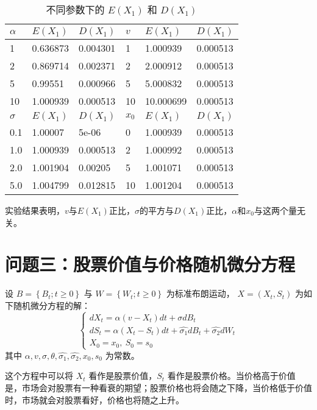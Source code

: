 \documentclass{article}
\begin{document}
\begin{table}[H]
    \centering
    \caption{不同参数下的 $E(X_1)$ 和 $D(X_1)$}
    \begin{tabular}{l|l|l|l|l|l}
    \hline
    $\alpha$ & $E(X_1)$ & $D(X_1)$ & $v$    & $E(X_1)$ & $D(X_1)$ \\ \hline
    1     & 0.636873 & 0.004301 & 1    & 1.000939  & 0.000513 \\
    2     & 0.869714 & 0.002371 & 2    & 2.000912  & 0.000513 \\
    5     & 0.99551  & 0.000966 & 5    & 5.000832  & 0.000513 \\
    10    & 1.000939 & 0.000513 & 10   & 10.000699 & 0.000513 \\ \hline 
    $\sigma$ & $E(X_1)$ & $D(X_1)$ & $x_0$ & $E(X_1)$ & $D(X_1)$ \\ \hline
    0.1   & 1.00007  & 5e-06    & 0    & 1.000939  & 0.000513 \\
    1.0   & 1.000939 & 0.000513 & 2    & 1.000992  & 0.000513 \\
    2.0   & 1.001904 & 0.00205  & 5    & 1.001071  & 0.000513 \\
    5.0   & 1.004799 & 0.012815 & 10   & 1.001204  & 0.000513 \\ \hline
    \end{tabular}
\end{table}
    
实验结果表明，$v$与$E(X_1)$正比，$\sigma$的平方与$D(X_1)$正比，$\alpha$和$x_0$与这两个量无关。




\section{问题三：股票价值与价格随机微分方程}
设 $B=\left\{B_{t} ; t \geq 0\right\}$ 与 $W=\left\{W_{t} ; t \geq 0\right\}$ 为标准布朗运动， $X=\left(X_{t} , S_t\right)$ 为如下随机微分方程的解：
$$
\left\{\begin{array}{l}
d X_{t}=\alpha\left(v-X_{t}\right) d t+\sigma d B_{t} \\
d S_{t} = \alpha\left(X_{t}-S_{t}\right) d t+\hat{\sigma_1} dB_t + \hat{\sigma_2} dW_t\\
X_{0}=x_{0}, \ S_0 = s_0
\end{array}\right.
$$
其中 $\alpha, v, \sigma, \theta, \hat{\sigma_1}, \hat{\sigma_2}, x_{0}, s_0$ 为常数。

这个方程中可以将 $X_t$ 看作是股票价值，$S_t$ 看作是股票价格。当价格高于价值是，市场会对股票有一种看衰的期望；股票价格也将会随之下降，当价格低于价值时，市场就会对股票看好，价格也将随之上升。
\end{document}
